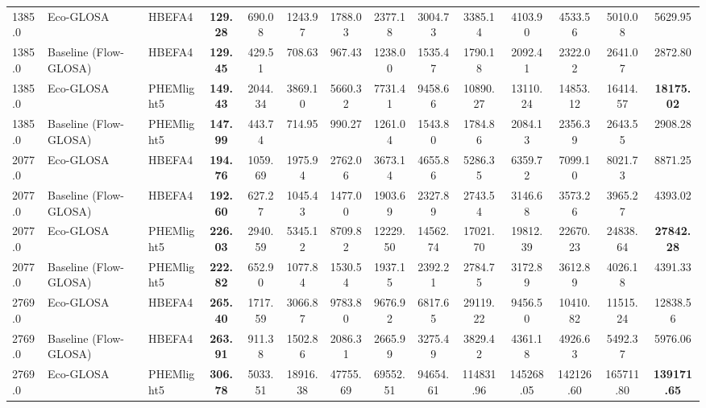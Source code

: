 \begin{table}[htb]
{\begin{tabular}{l l l *{11}{c}}
      \midrule
      1385.0& Eco-GLOSA                  & HBEFA4       & \textbf{129.28}     & 690.08     & 1243.97    & 1788.03    & 2377.18    & 3004.73    & 3385.14    & 4103.90    & 4533.56    & 5010.08    & 5629.95    \\
      1385.0& Baseline (Flow-GLOSA)      & HBEFA4       & \textbf{129.45}     & 429.51 & 708.63     & 967.43     & 1238.00    & 1535.47    & 1790.18    & 2092.41    & 2322.02    & 2641.07    & 2872.80    \\
      1385.0& Eco-GLOSA                  & PHEMlight5   & \textbf{149.43}     & 2044.34    & 3869.10    & 5660.32    & 7731.41    & 9458.66    & 10890.27   & 13110.24   & 14853.12   & 16414.57   & \textbf{18175.02} \\
      1385.0& Baseline (Flow-GLOSA)      & PHEMlight5   & \textbf{147.99}     & 443.74     & 714.95     & 990.27     & 1261.04    & 1543.80    & 1784.86    & 2084.13    & 2356.39    & 2643.55    & 2908.28    \\
      \midrule
      2077.0& Eco-GLOSA                  & HBEFA4       & \textbf{194.76}     & 1059.69    & 1975.94    & 2762.06    & 3673.14    & 4655.86    & 5286.35    & 6359.72    & 7099.10    & 8021.73    & 8871.25    \\
      2077.0& Baseline (Flow-GLOSA)      & HBEFA4       & \textbf{192.60}     & 627.27 & 1045.43    & 1477.00    & 1903.69    & 2327.89    & 2743.54    & 3146.68    & 3573.26    & 3965.27    & 4393.02    \\
      2077.0& Eco-GLOSA                  & PHEMlight5   & \textbf{226.03}     & 2940.59    & 5345.12    & 8709.82    & 12229.50   & 14562.74   & 17021.70   & 19812.39   & 22670.23   & 24838.64   & \textbf{27842.28} \\
      2077.0& Baseline (Flow-GLOSA)      & PHEMlight5   & \textbf{222.82}     & 652.90     & 1077.84    & 1530.54    & 1937.15    & 2392.21    & 2784.75    & 3172.89    & 3612.89    & 4026.18    & 4391.33    \\
      \midrule
      2769.0& Eco-GLOSA                  & HBEFA4       & \textbf{265.40}     & 1717.59    & 3066.87    & 9783.80 & 9676.92    & 6817.65    & 29119.22 & 9456.50    & 10410.82   & 11515.24   & 12838.56   \\
      2769.0& Baseline (Flow-GLOSA)      & HBEFA4       & \textbf{263.91}     & 911.38     & 1502.86    & 2086.31    & 2665.99    & 3275.49    & 3829.42    & 4361.18    & 4926.63    & 5492.37    & 5976.06    \\
      2769.0& Eco-GLOSA                  & PHEMlight5   & \textbf{306.78}     & 5033.51    & 18916.38   & 47755.69   & 69552.51   & 94654.61   & 114831.96  & 145268.05  & 142126.60  & 165711.80  & \textbf{139171.65} \\

\end{tabular}}
\end{table}
